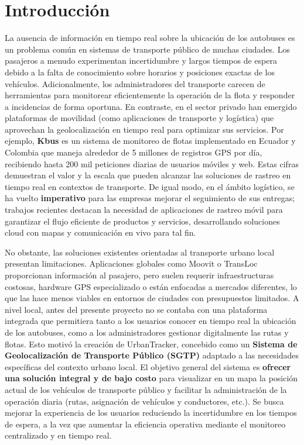 \section{Introducción}
La ausencia de información en tiempo real sobre la ubicación de los autobuses es un problema común en sistemas de transporte público de muchas ciudades. Los pasajeros a menudo experimentan incertidumbre y largos tiempos de espera debido a la falta de conocimiento sobre horarios y posiciones exactas de los vehículos. Adicionalmente, los administradores del transporte carecen de herramientas para monitorear eficientemente la operación de la flota y responder a incidencias de forma oportuna. En contraste, en el sector privado han emergido plataformas de movilidad (como aplicaciones de transporte y logística) que aprovechan la geolocalización en tiempo real para optimizar sus servicios. Por ejemplo, \textbf{Kbus} es un sistema de monitoreo de flotas implementado en Ecuador y Colombia que maneja alrededor de 5 millones de registros GPS por día, recibiendo hasta 200 mil peticiones diarias de usuarios móviles y web\cite{torres2020kbus}. Estas cifras demuestran el valor y la escala que pueden alcanzar las soluciones de rastreo en tiempo real en contextos de transporte. De igual modo, en el ámbito logístico, se ha vuelto \textbf{imperativo} para las empresas mejorar el seguimiento de sus entregas; trabajos recientes destacan la necesidad de aplicaciones de rastreo móvil para garantizar el flujo eficiente de productos y servicios, desarrollando soluciones cloud con mapas y comunicación en vivo para tal fin\cite{odesanya2025cloud}.

No obstante, las soluciones existentes orientadas al transporte urbano local presentan limitaciones. Aplicaciones globales como Moovit o TransLoc proporcionan información al pasajero, pero suelen requerir infraestructuras costosas, hardware GPS especializado o están enfocadas a mercados diferentes, lo que las hace menos viables en entornos de ciudades con presupuestos limitados. A nivel local, antes del presente proyecto no se contaba con una plataforma integrada que permitiera tanto a los usuarios conocer en tiempo real la ubicación de los autobuses, como a los administradores gestionar digitalmente las rutas y flotas. Esto motivó la creación de UrbanTracker, concebido como un \textbf{Sistema de Geolocalización de Transporte Público (SGTP)} adaptado a las necesidades específicas del contexto urbano local. El objetivo general del sistema es \textbf{ofrecer una solución integral y de bajo costo} para visualizar en un mapa la posición actual de los vehículos de transporte público y facilitar la administración de la operación diaria (rutas, asignación de vehículos y conductores, etc.). Se busca mejorar la experiencia de los usuarios reduciendo la incertidumbre en los tiempos de espera, a la vez que aumentar la eficiencia operativa mediante el monitoreo centralizado y en tiempo real.

